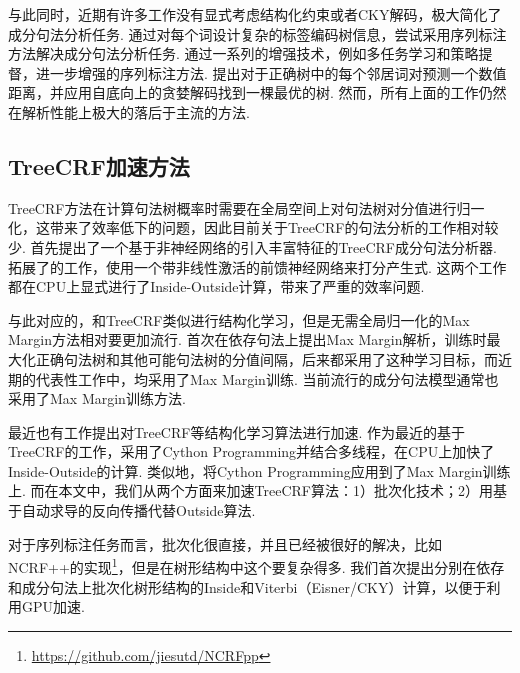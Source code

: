 与此同时，近期有许多工作没有显式考虑结构化约束或者CKY解码，极大简化了成分句法分析任务.
\citet{gomez-rodriguez-vilares-2018-constituent}通过对每个词设计复杂的标签编码树信息，尝试采用序列标注方法解决成分句法分析任务.
\citet{vilares-etal-2019-better}通过一系列的增强技术，例如多任务学习和策略提督，进一步增强的序列标注方法.
\citet{shen-etal-2018-straight}提出对于正确树中的每个邻居词对预测一个数值距离，并应用自底向上的贪婪解码找到一棵最优的树.
然而，所有上面的工作仍然在解析性能上极大的落后于主流的方法.

\subsection{TreeCRF加速方法}

TreeCRF方法在计算句法树概率时需要在全局空间上对句法树对分值进行归一化，这带来了效率低下的问题，因此目前关于TreeCRF的句法分析的工作相对较少.
\citet{finkel-etal-2008-efficient}首先提出了一个基于非神经网络的引入丰富特征的TreeCRF成分句法分析器.
\citet{durrett-klein-2015-neural}拓展了\citet{finkel-etal-2008-efficient}的工作，使用一个带非线性激活的前馈神经网络来打分产生式.
这两个工作都在CPU上显式进行了Inside-Outside计算，带来了严重的效率问题.

与此对应的，和TreeCRF类似进行结构化学习，但是无需全局归一化的Max Margin方法相对要更加流行.
\citet{taskar-etal-2004-max}首次在依存句法上提出Max Margin解析，训练时最大化正确句法树和其他可能句法树的分值间隔，后来\citet{mcdonald-etal-2005-online,mcdonald-etal-2005-online}都采用了这种学习目标，而近期的代表性工作中，\citet{wang-chang-2016-graph,kiperwasser-goldberg-2016-simple}均采用了Max Margin训练.
当前流行的成分句法模型\citep{stern-etal-2017-minimal,kitaev-klein-2018-constituency,zhou-zhao-2019-head}通常也采用了Max Margin训练方法.

最近也有工作提出对TreeCRF等结构化学习算法进行加速.
\citet{zhang-etal-2017-dependency-parsing,jiang-etal-2018-supervised,li-etal-2019-semi-supervised}作为最近的基于TreeCRF的工作，采用了Cython Programming并结合多线程，在CPU上加快了Inside-Outside的计算.
类似地，\citet{kitaev-klein-2018-constituency}将Cython Programming应用到了Max Margin训练上.
而在本文中，我们从两个方面来加速TreeCRF算法：1）批次化技术；2）用基于自动求导的反向传播代替Outside算法.

对于序列标注任务而言，批次化很直接，并且已经被很好的解决，比如NCRF++的实现\footnote{\url{https://github.com/jiesutd/NCRFpp}}，但是在树形结构中这个要复杂得多.
我们首次提出分别在依存和成分句法上批次化树形结构的Inside和Viterbi（Eisner/CKY）计算，以便于利用GPU加速.

